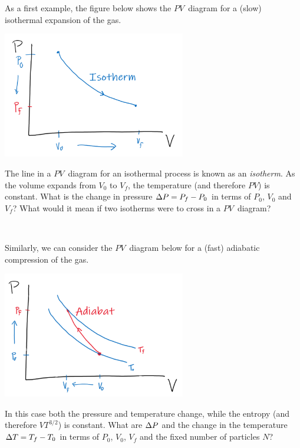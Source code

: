 As a first example, the figure below shows the $PV$~diagram for a (slow) isothermal expansion of the gas.
\begin{center}
  \includegraphics[width=0.6\textwidth]{figs/unit05_isotherm.pdf}
\end{center}
The line in a $PV$~diagram for an isothermal process is known as an \textit{isotherm}.
As the volume expands from $V_0$ to $V_f$, the temperature (and therefore $PV$) is constant.
What is the change in pressure $\Delta P = P_f - P_0$ in terms of $P_0$, $V_0$ and $V_f$?
What would it mean if two isotherms were to cross in a $PV$~diagram?
\begin{mdframed}
  \ \\[100 pt]
\end{mdframed}

Similarly, we can consider the $PV$~diagram below for a (fast) adiabatic compression of the gas.
\begin{center}
  \includegraphics[width=0.6\textwidth]{figs/unit05_adiabat.pdf}
\end{center}
In this case both the pressure and temperature change, while the entropy (and therefore $VT^{3 / 2}$) is constant.
What are $\Delta P$ and the change in the temperature $\Delta T = T_f - T_0$ in terms of $P_0$, $V_0$, $V_f$ and the fixed number of particles $N$? %
\begin{mdframed}
  \ \\[120 pt]
\end{mdframed}



